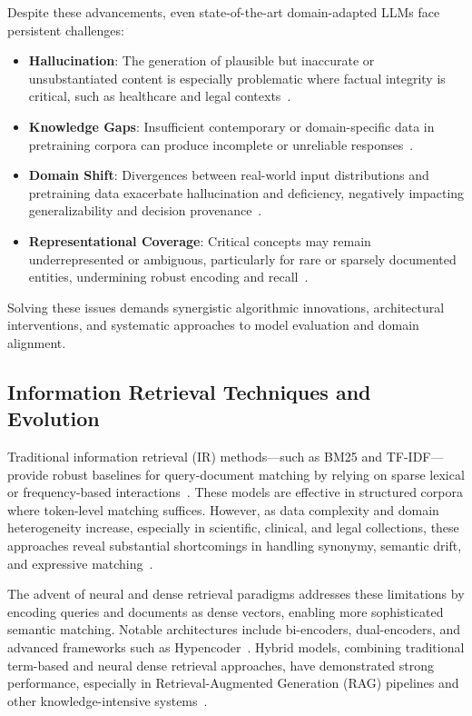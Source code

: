\documentclass[sigconf]{acmart}
\begin{document}
Despite these advancements, even state-of-the-art domain-adapted LLMs face persistent challenges:

\begin{itemize}
  \item \textbf{Hallucination}: The generation of plausible but inaccurate or unsubstantiated content is especially problematic where factual integrity is critical, such as healthcare and legal contexts~\cite{ref7,ref20,ref46,ref52,ref54,ref63,ref64}.
  \item \textbf{Knowledge Gaps}: Insufficient contemporary or domain-specific data in pretraining corpora can produce incomplete or unreliable responses~\cite{ref7,ref20,ref54,ref64}.
  \item \textbf{Domain Shift}: Divergences between real-world input distributions and pretraining data exacerbate hallucination and deficiency, negatively impacting generalizability and decision provenance~\cite{ref7,ref63,ref64}.
  \item \textbf{Representational Coverage}: Critical concepts may remain underrepresented or ambiguous, particularly for rare or sparsely documented entities, undermining robust encoding and recall~\cite{ref20,ref46,ref63}.
\end{itemize}

Solving these issues demands synergistic algorithmic innovations, architectural interventions, and systematic approaches to model evaluation and domain alignment.

\subsection{Information Retrieval Techniques and Evolution}

Traditional information retrieval (IR) methods---such as BM25 and TF-IDF---provide robust baselines for query-document matching by relying on sparse lexical or frequency-based interactions~\cite{ref42,ref44,ref52}. These models are effective in structured corpora where token-level matching suffices. However, as data complexity and domain heterogeneity increase, especially in scientific, clinical, and legal collections, these approaches reveal substantial shortcomings in handling synonymy, semantic drift, and expressive matching~\cite{ref43,ref44,ref52}.

The advent of neural and dense retrieval paradigms addresses these limitations by encoding queries and documents as dense vectors, enabling more sophisticated semantic matching. Notable architectures include bi-encoders, dual-encoders, and advanced frameworks such as Hypencoder~\cite{ref4,ref5,ref8,ref10,ref14,ref15,ref16,ref17,ref22,ref26,ref28,ref36,ref37,ref38,ref43,ref52,ref54,ref55}. Hybrid models, combining traditional term-based and neural dense retrieval approaches, have demonstrated strong performance, especially in Retrieval-Augmented Generation (RAG) pipelines and other knowledge-intensive systems~\cite{ref42,ref43,ref52,ref54}.
\end{document}
